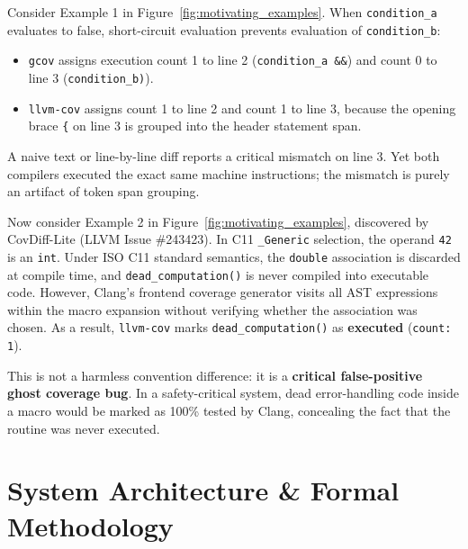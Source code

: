 \documentclass[sigconf,review,anonymous=false]{acmart}
\theoremstyle{definition}
\begin{document}
Consider Example 1 in Figure~\ref{fig:motivating_examples}. When \texttt{condition\_a} evaluates to false, short-circuit evaluation prevents evaluation of \texttt{condition\_b}:
\begin{itemize}
    \item \texttt{gcov} assigns execution count 1 to line 2 (\texttt{condition\_a \&\&}) and count 0 to line 3 (\texttt{condition\_b)}).
    \item \texttt{llvm-cov} assigns count 1 to line 2 and count 1 to line 3, because the opening brace \texttt{\{} on line 3 is grouped into the header statement span.
\end{itemize}
A naive text or line-by-line diff reports a critical mismatch on line 3. Yet both compilers executed the exact same machine instructions; the mismatch is purely an artifact of token span grouping.

Now consider Example 2 in Figure~\ref{fig:motivating_examples}, discovered by CovDiff-Lite (LLVM Issue \#243423). In C11 \texttt{\_Generic} selection, the operand \texttt{42} is an \texttt{int}. Under ISO C11 standard semantics, the \texttt{double} association is discarded at compile time, and \texttt{dead\_computation()} is never compiled into executable code. 
However, Clang's frontend coverage generator visits all AST expressions within the macro expansion without verifying whether the association was chosen. As a result, \texttt{llvm-cov} marks \texttt{dead\_computation()} as \textbf{executed} (\texttt{count: 1}). 

This is not a harmless convention difference: it is a \textbf{critical false-positive ghost coverage bug}. In a safety-critical system, dead error-handling code inside a macro would be marked as 100\% tested by Clang, concealing the fact that the routine was never executed.

\section{System Architecture \& Formal Methodology}
\end{document}
